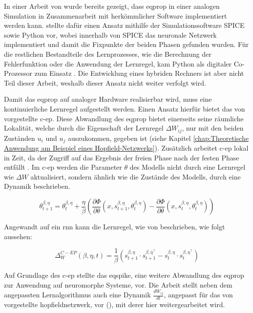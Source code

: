In einer Arbeit von \citeauthor{Kendall2020} wurde bereits gezeigt, dass \gls{eqprop} in einer analogen Simulation in Zusammenarbeit mit herkömmlicher Software implementiert werden kann. \citeauthor{Kendall2020} stellte dafür einen Ansatz mithilfe der Simulationssoftware SPICE sowie Python vor, wobei innerhalb von SPICE das neuronale Netzwerk implementiert und damit die Fixpunkte der beiden Phasen gefunden wurden. Für die restlichen Bestandteile des Lernprozesses, wie die Berechnung der Fehlerfunktion oder die Anwendung der Lernregel, kam Python als digitaler Co-Prozessor zum Einsatz \cite[vgl. S. 27]{Kendall2020}. Die Entwicklung eines hybriden Rechners ist aber nicht Teil dieser Arbeit, weshalb dieser Ansatz nicht weiter verfolgt wird.

Damit das \gls{eqprop} auf analoger Hardware realisierbar wird, muss eine kontinuierliche Lernregel aufgestellt werden. Einen Ansatz hierfür bietet das \citeyear{Ernoult2020} von \citeauthor{Ernoult2020} vorgestellte \gls{c-ep}. Diese Abwandlung des \gls{eqprop} bietet einerseits seine räumliche Lokalität, welche durch die Eigenschaft der Lernregel \(\Delta W_{ij}\), nur mit den beiden Zuständen \(u_{i}\) und \(u_{j}\) auszukommen, gegeben ist (siehe Kapitel \ref{chap:Theoretische Anwendung am Beispiel eines Hopfield-Netzwerks}). Zusätzlich arbeitet \gls{c-ep} lokal in Zeit, da der Zugriff auf das Ergebnis der freien Phase nach der festen Phase entfällt \cite[vgl. S. 3 f.]{Ernoult2020}. Im \gls{c-ep} werden die Parameter \(\theta\) des Modells nicht durch eine Lernregel wie \(\Delta W\) aktualisiert, sondern ähnlich wie die Zustände des Modells, durch eine Dynamik beschrieben.

\[\theta^{\beta,\eta}_{t+1}={\theta^{\beta,\eta}_{t}}+\frac{\eta}{\beta}\left(\frac{\partial{\Phi}}{\partial{\theta}}(x,s^{\beta,\eta}_{t+1},\theta^{\beta,\eta}_{t})-\frac{\partial{\Phi}}{\partial{\theta}}(x,s^{\beta,\eta}_{t},\theta^{\beta,\eta}_{t})\right)\]

Angewandt auf ein \gls{rnn} kann die Lernregel, wie von \citeauthor{Ernoult2020} beschrieben, wie folgt aussehen:

\[\Delta^{C-EP}_W(\beta,\eta,t)=\frac{1}{\beta}(s^{\beta,\eta}_{t+1}\cdot s^{\beta,\eta^{\intercal}}_{t+1}-s^{\beta,\eta}_{t}\cdot s^{\beta,\eta^{\intercal}}_{t})\]

Auf Grundlage des \gls{c-ep} stellte \citeauthor{Martin2020} das \gls{eqspike}, eine weitere Abwandlung des \gls{eqprop} zur Anwendung auf neuromorphe Systeme, vor. Die Arbeit stellt neben dem angepassten Lernalgorithmus auch eine Dynamik \(\frac{dW_{ij}}{dt}\), angepasst für das von \citeauthor{Scellier2017} vorgestellte \gls{hopfieldnetzwerk}, vor (\cite[vgl. S. 3]{Martin2020}), mit derer hier weitergearbeitet wird.

